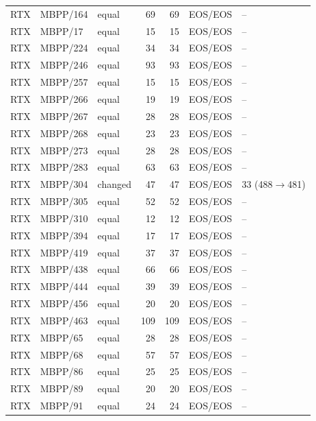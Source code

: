 \begin{longtable}{@{}lllrrll@{}}
RTX & MBPP/164 & equal & 69 & 69 & EOS/EOS & -- \\
RTX & MBPP/17 & equal & 15 & 15 & EOS/EOS & -- \\
RTX & MBPP/224 & equal & 34 & 34 & EOS/EOS & -- \\
RTX & MBPP/246 & equal & 93 & 93 & EOS/EOS & -- \\
RTX & MBPP/257 & equal & 15 & 15 & EOS/EOS & -- \\
RTX & MBPP/266 & equal & 19 & 19 & EOS/EOS & -- \\
RTX & MBPP/267 & equal & 28 & 28 & EOS/EOS & -- \\
RTX & MBPP/268 & equal & 23 & 23 & EOS/EOS & -- \\
RTX & MBPP/273 & equal & 28 & 28 & EOS/EOS & -- \\
RTX & MBPP/283 & equal & 63 & 63 & EOS/EOS & -- \\
RTX & MBPP/304 & changed & 47 & 47 & EOS/EOS & 33 (488$\to$481) \\
RTX & MBPP/305 & equal & 52 & 52 & EOS/EOS & -- \\
RTX & MBPP/310 & equal & 12 & 12 & EOS/EOS & -- \\
RTX & MBPP/394 & equal & 17 & 17 & EOS/EOS & -- \\
RTX & MBPP/419 & equal & 37 & 37 & EOS/EOS & -- \\
RTX & MBPP/438 & equal & 66 & 66 & EOS/EOS & -- \\
RTX & MBPP/444 & equal & 39 & 39 & EOS/EOS & -- \\
RTX & MBPP/456 & equal & 20 & 20 & EOS/EOS & -- \\
RTX & MBPP/463 & equal & 109 & 109 & EOS/EOS & -- \\
RTX & MBPP/65 & equal & 28 & 28 & EOS/EOS & -- \\
RTX & MBPP/68 & equal & 57 & 57 & EOS/EOS & -- \\
RTX & MBPP/86 & equal & 25 & 25 & EOS/EOS & -- \\
RTX & MBPP/89 & equal & 20 & 20 & EOS/EOS & -- \\
RTX & MBPP/91 & equal & 24 & 24 & EOS/EOS & -- \\
\bottomrule\end{longtable}
